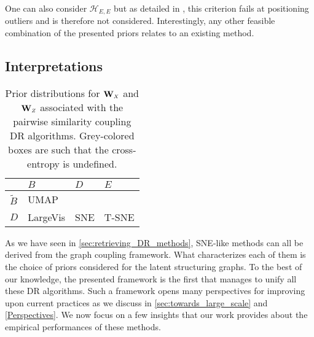 \begin{remark}
One can also consider $\mathcal{H}_{E,E}$ but as detailed in \cite{maaten2008tSNE}, this criterion fails at positioning outliers and is therefore not considered. 
Interestingly, any other feasible combination of the presented priors relates to an existing method.
\end{remark}

\subsection{Interpretations}\label{sec:interpretations}

\begin{table}[]
    \caption{Prior distributions for $\W_{\scaleto{X}{4pt}}$ and $\W_{\scaleto{Z}{4pt}}$ associated with the pairwise similarity coupling DR algorithms. Grey-colored boxes are such that the cross-entropy is undefined.}
    \begin{center}
    \begin{small}
    \begin{sc}
    \centering
    \renewcommand{\arraystretch}{2}
    \begin{NiceTabular}{|W{c}{1cm}|W{c}{1.8cm}|W{c}{1.8cm}|W{c}{1.8cm}|}
    \hline
     & $B$ & $D$ & $E$ \\
    \hline
    $\widetilde{B}$ & UMAP &  &  \\
    \hline
    $D$ & LargeVis & SNE & T-SNE\\
    \hline
    \end{NiceTabular}
    \label{tableau_priors}
    \end{sc}
    \end{small}
    \end{center}
    \label{priors_methods}
\end{table}

As we have seen in \cref{sec:retrieving_DR_methods}, SNE-like methods can all be derived from the graph coupling framework.  What characterizes each of them is the choice of priors considered for the latent structuring graphs. To the best of our knowledge, the presented framework is the first that manages to unify all these DR algorithms. Such a framework opens many perspectives for improving upon current practices as we discuss in \cref{sec:towards_large_scale} and \cref{Perspectives}. 
We now focus on a few insights that our work provides about the empirical performances of these methods. 

